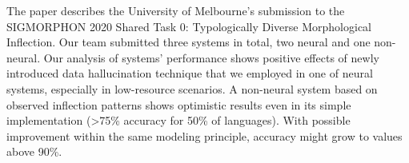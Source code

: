 The paper describes the University of Melbourne's submission to the SIGMORPHON 2020 Shared Task 0: Typologically Diverse Morphological Inflection. Our team submitted three systems in total, two neural and one non-neural. Our analysis of systems' performance shows positive effects of newly introduced data hallucination technique that we employed in one of neural systems, especially in low-resource scenarios. A non-neural system based on observed inflection patterns shows optimistic results even in its simple implementation (>75\% accuracy for 50\% of languages). With possible improvement within the same modeling principle, accuracy might grow to values above 90\%.
